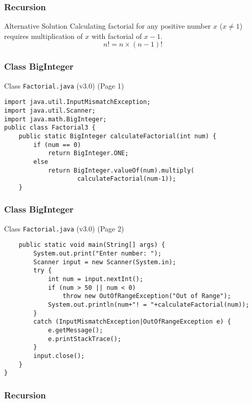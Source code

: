 \documentclass[10pt, compress]{beamer}
\begin{document}
\begin{frame}[fragile]
\frametitle{Recursion}
	\begin{block}{Alternative Solution}
		Calculating factorial for any positive number $x$ ($x \neq 1$) requires multiplication of $x$ with factorial of $x-1$.
		\begin{equation}
		n! = n \times (n-1)!
		\end{equation}
	\end{block}
\end{frame}

\begin{frame}[fragile]
\frametitle{Class BigInteger}
	\begin{block}{Class \texttt{Factorial.java} (v3.0) (Page 1)}
		\begin{verbatim}
import java.util.InputMismatchException;
import java.util.Scanner;
import java.math.BigInteger;
public class Factorial3 {
	public static BigInteger calculateFactorial(int num) {
		if (num == 0)
			return BigInteger.ONE;
		else
			return BigInteger.valueOf(num).multiply(
					calculateFactorial(num-1));
	}
		\end{verbatim}
	\end{block}
\end{frame}

\begin{frame}[fragile]
\frametitle{Class BigInteger}
	\begin{block}{Class \texttt{Factorial.java} (v3.0) (Page 2)}
		\begin{verbatim}
	public static void main(String[] args) {
		System.out.print("Enter number: ");
		Scanner input = new Scanner(System.in);
		try {
			int num = input.nextInt();
			if (num > 50 || num < 0)
				throw new OutOfRangeException("Out of Range");
			System.out.println(num+"! = "+calculateFactorial(num));
		}
		catch (InputMismatchException|OutOfRangeException e) {
			e.getMessage();
			e.printStackTrace();
		}
		input.close();
	}
}
		\end{verbatim}
	\end{block}
\end{frame}

\begin{frame}[fragile]
\frametitle{Recursion}
\begin{figure}[H]\centering
{}
\setcounter{density}{20}
\def\couleur{turquoise}
\end{figure}
\end{frame}
\end{document}
